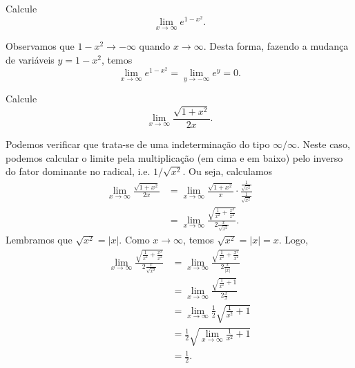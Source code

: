 \begin{exeresol}
  Calcule
  \begin{equation}
    \lim_{x\to \infty} e^{1-x^2}.
  \end{equation}
\end{exeresol}
\begin{resol}
  Observamos que $1-x^2\to -\infty$ quando $x\to \infty$. Desta forma, fazendo a mudança de variáveis $y = 1 - x^2$, temos
  \begin{equation}
    \lim_{x\to\infty} e^{1-x^2} = \lim_{y\to -\infty} e^y = 0.
  \end{equation}
\end{resol}

\begin{exeresol}
  Calcule
  \begin{equation}
    \lim_{x\to\infty} \frac{\sqrt{1+x^2}}{2x}.
  \end{equation}
\end{exeresol}
\begin{resol}
  Podemos verificar que trata-se de uma indeterminação do tipo $\infty/\infty$. Neste caso, podemos calcular o limite pela multiplicação (em cima e em baixo) pelo inverso do fator dominante no radical, i.e. $1/\sqrt{x^2}$. Ou seja, calculamos
  \begin{align}
    \lim_{x\to\infty} \frac{\sqrt{1+x^2}}{2x} &= \lim_{x\to\infty} \frac{\sqrt{1+x^2}}{x}\cdot \frac{\frac{1}{\sqrt{x^2}}}{\frac{1}{\sqrt{x^2}}} \\
                                             &= \lim_{x\to\infty} \frac{\sqrt{\frac{1}{x^2}+\frac{x^2}{x^2}}}{2\frac{x}{\sqrt{x^2}}}.
  \end{align}
  Lembramos que $\sqrt{x^2}=|x|$. Como $x\to\infty$, temos $\sqrt{x^2} = |x|=x$. Logo,
  \begin{align}
    \lim_{x\to\infty} \frac{\sqrt{\frac{1}{x^2}+\frac{x^2}{x^2}}}{2\frac{x}{\sqrt{x^2}}} &= \lim_{x\to\infty} \frac{\sqrt{\frac{1}{x^2}+\frac{x^2}{x^2}}}{2\frac{x}{|x|}}\\
                                                                                         &= \lim_{x\to\infty} \frac{\sqrt{\frac{1}{x^2}+1}}{2\frac{x}{x}}\\
                                                                                         &= \lim_{x\to\infty} \frac{1}{2}\sqrt{\frac{1}{x^2}+1}\\
                                                                                         &= \frac{1}{2}\sqrt{\lim_{x\to\infty} \frac{1}{x^2}+1}\\
                                                                                         &= \frac{1}{2}.
  \end{align}
\end{resol}


